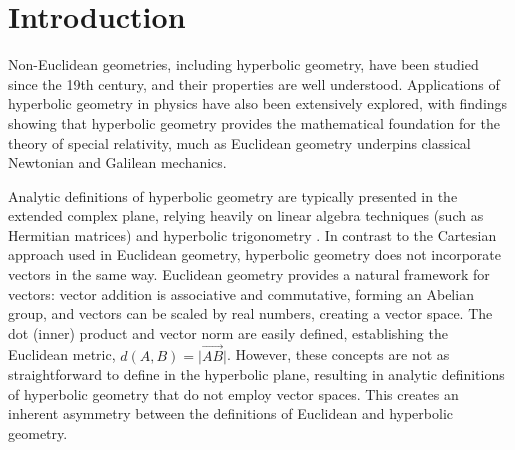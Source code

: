 \documentclass[a4paper]{article}
\theoremstyle{definition}
\begin{document}
\begin{abstract}
  In this paper we describe an Isabelle/HOL formalization of
  non-commu\-ta\-ti\-ve and non-associative algebraic structures
  called \emph{gyrogroups} and \emph{gyrovector spaces}. These were
  introduced by Abraham A. Ungar and have deep connections to
  hyperbolic geometry and special relativity. Gyrovector spaces can be
  used to define models of hyperbolic geometry. In contrast to other
  models, gyrovector spaces have the advantage that all definitions
  have remarkable syntactical similarities with normal Euclidean and
  Cartesian geometry (e.g., points on line between $a$ and $b$ satisfy
  the equation $a \oplus t\otimes(\ominus a \oplus b)$, while the
  hyperbolic Pythagorean theorem is given by $a^2\oplus b^2 = c^2$,
  where $\otimes$, $\oplus$, and $\ominus$ are gyro operations).

  We first formally define gyrogroups and gyrovector spaces, and prove
  their numerous properties. Then we formalize M\"obius and Einstein
  models of these abstract structures and then formally prove that
  these are equivalent to Poincar\'e and Klen-Beltrami models and
  satisfy Tarski's geometry axioms for hyperbolic geometry,
\end{abstract}

\section{Introduction}

Non-Euclidean geometries, including hyperbolic geometry, have been
studied since the 19th century, and their properties are well
understood. Applications of hyperbolic geometry in physics have also
been extensively explored, with findings showing that hyperbolic
geometry provides the mathematical foundation for the theory of
special relativity, much as Euclidean geometry underpins classical
Newtonian and Galilean mechanics.

Analytic definitions of hyperbolic geometry are typically presented in
the extended complex plane, relying heavily on linear algebra
techniques (such as Hermitian matrices) and hyperbolic trigonometry
\cite{schwerdtfeger}. In contrast to the Cartesian approach used in
Euclidean geometry, hyperbolic geometry does not incorporate vectors
in the same way. Euclidean geometry provides a natural framework for
vectors: vector addition is associative and commutative, forming an
Abelian group, and vectors can be scaled by real numbers, creating a
vector space. The dot (inner) product and vector norm are easily
defined, establishing the Euclidean metric,
$d(A, B) = \vert\overrightarrow{AB}\vert$. However, these concepts are
not as straightforward to define in the hyperbolic plane, resulting in
analytic definitions of hyperbolic geometry that do not employ vector
spaces. This creates an inherent asymmetry between the definitions of
Euclidean and hyperbolic geometry.
\end{document}
